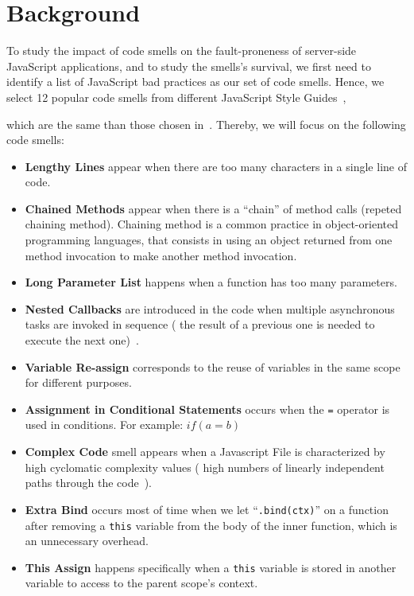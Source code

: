 \section{Background}\label{sec:background}

To study the impact of code smells on the fault-proneness of server-side JavaScript applications, {\color{blue} and to study the smells's survival}, we first need to identify a list of JavaScript bad practices as our set of code smells. Hence, we select 12 popular code smells from different JavaScript Style Guides~\cite{fard2013jsnose, npmjss, nodejss, airbnbjss, jqueryjss, ESLint}, {\color{blue} which are the same than those chosen in~\cite{saboury2017empirical}. Thereby, we will focus on the following code smells:
\begin{itemize}
	\item \textbf{Lengthy Lines} appear when there are too many characters in a single line of code.
	\item \textbf{Chained Methods} appear when there is a ``chain'' of method calls (repeted chaining method). Chaining method is a common practice in object-oriented programming languages, that consists in using an object returned from one method invocation to make another method invocation.
	\item \textbf{Long Parameter List} happens when a function has too many parameters.
	\item \textbf{Nested Callbacks} are introduced in the code when multiple asynchronous tasks are invoked in sequence (\ie{} the result of a previous one is needed to execute the next one)~\cite{brodu2015toward, gallaba2015don}.
	\item \textbf{Variable Re-assign} corresponds to the reuse of variables in the same scope for different purposes.
	\item \textbf{Assignment in Conditional Statements} occurs when the \texttt{=} operator is used in conditions. For example: $if ( a = b )$
	\item \textbf{Complex Code} smell appears when a Javascript File is characterized by high cyclomatic complexity values (\ie{} high numbers of linearly independent paths through the code~\cite{mccabe1976complexity}).
	\item \textbf{Extra Bind} occurs most of time when we let ``\texttt{.bind(ctx)}'' on a function after removing a \texttt{this} variable from the body of the inner function, which is an unnecessary overhead.
	\item \textbf{This Assign} happens specifically when a \texttt{this} variable is stored in another variable to access to the parent scope's context.

\end{itemize}}

